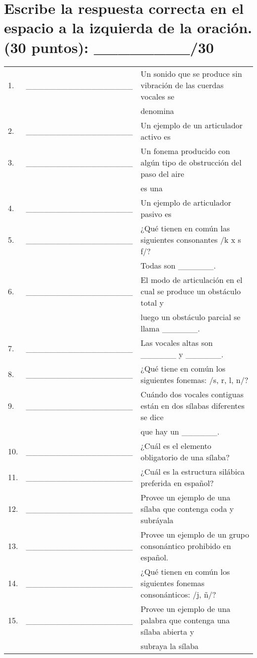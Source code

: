 \documentclass[12pt]{exam}
\begin{document}
\vspace{0.1in} 


\section{Escribe la respuesta correcta en el espacio a la izquierda de la oración. (30 puntos): \_\_\_\_\_\_\_\_/30}

\renewcommand{\arraystretch}{1.95}
	\begin{tabular}{@{}llp{2cm}@{}}
	 1.  & \_\_\_\_\_\_\_\_\_\_\_\_\_\_\_\_\_\_ & Un sonido que se produce sin vibración de las cuerdas vocales se \\&& denomina        \\
	 2.  & \_\_\_\_\_\_\_\_\_\_\_\_\_\_\_\_\_\_ & Un ejemplo de un articulador activo es                                           \\
	 3.  & \_\_\_\_\_\_\_\_\_\_\_\_\_\_\_\_\_\_ & Un fonema producido con algún tipo de obstrucción del paso del aire \\&& es una       \\
	 4.  & \_\_\_\_\_\_\_\_\_\_\_\_\_\_\_\_\_\_ & Un ejemplo de articulador pasivo es \\
	 5.  & \_\_\_\_\_\_\_\_\_\_\_\_\_\_\_\_\_\_ & ¿Qué tienen en común las siguientes consonantes /k x s f/? \\&& Todas son \_\_\_\_\_\_.\\
	 6.  & \_\_\_\_\_\_\_\_\_\_\_\_\_\_\_\_\_\_ & El modo de articulación en el cual se produce un obstáculo total y \\&& luego un obstáculo parcial se llama \_\_\_\_\_\_.\\
	 7. & \_\_\_\_\_\_\_\_\_\_\_\_\_\_\_\_\_\_ & Las vocales altas son \_\_\_\_\_\_ y \_\_\_\_\_\_.\\
	 8. & \_\_\_\_\_\_\_\_\_\_\_\_\_\_\_\_\_\_ & ¿Qué tiene en común los siguientes fonemas: /s, r, l, n/?\\
	 9. & \_\_\_\_\_\_\_\_\_\_\_\_\_\_\_\_\_\_ & Cuándo dos vocales contiguas están en dos sílabas diferentes se dice \\&& que hay un \_\_\_\_\_\_.\\
	 10. & \_\_\_\_\_\_\_\_\_\_\_\_\_\_\_\_\_\_ & ¿Cuál es el elemento obligatorio de una sílaba?\\
	 11. & \_\_\_\_\_\_\_\_\_\_\_\_\_\_\_\_\_\_ & ¿Cuál es la estructura silábica preferida en español?\\
	 12. & \_\_\_\_\_\_\_\_\_\_\_\_\_\_\_\_\_\_ & Provee un ejemplo de una sílaba que contenga coda y subráyala \\
	 13. & \_\_\_\_\_\_\_\_\_\_\_\_\_\_\_\_\_\_ & Provee un ejemplo de un grupo consonántico prohibido en español. \\
	 14. & \_\_\_\_\_\_\_\_\_\_\_\_\_\_\_\_\_\_ & ¿Qué tienen en común los siguientes fonemas consonánticos: /j, ñ/? \\
	 15. & \_\_\_\_\_\_\_\_\_\_\_\_\_\_\_\_\_\_ & Provee un ejemplo de una palabra que contenga una sílaba abierta y \\&& subraya la sílaba\\
	\end{tabular}
\end{document}
